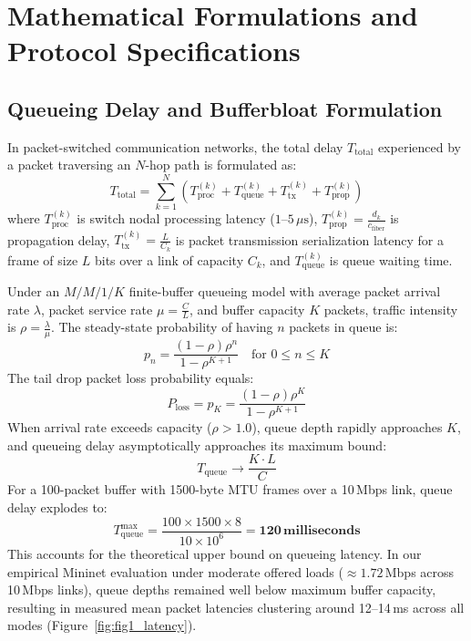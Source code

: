 \chapter[Mathematical Formulations and Protocol Specs]{Mathematical Formulations and Protocol Specifications}
\label{app:math_and_specs}

\section{Queueing Delay and Bufferbloat Formulation}
In packet-switched communication networks, the total delay $T_{\text{total}}$ experienced by a packet traversing an $N$-hop path is formulated as:
\begin{equation}
  T_{\text{total}} = \sum_{k=1}^N \left( T_{\text{proc}}^{(k)} + T_{\text{queue}}^{(k)} + T_{\text{tx}}^{(k)} + T_{\text{prop}}^{(k)} \right)
\end{equation}
where $T_{\text{proc}}^{(k)}$ is switch nodal processing latency ($1\text{--}5\,\mu\text{s}$), $T_{\text{prop}}^{(k)} = \frac{d_k}{c_{\text{fiber}}}$ is propagation delay, $T_{\text{tx}}^{(k)} = \frac{L}{C_k}$ is packet transmission serialization latency for a frame of size $L$ bits over a link of capacity $C_k$, and $T_{\text{queue}}^{(k)}$ is queue waiting time.

Under an $M/M/1/K$ finite-buffer queueing model with average packet arrival rate $\lambda$, packet service rate $\mu = \frac{C}{L}$, and buffer capacity $K$ packets, traffic intensity is $\rho = \frac{\lambda}{\mu}$. The steady-state probability of having $n$ packets in queue is:
\begin{equation}
  p_n = \frac{(1 - \rho)\rho^n}{1 - \rho^{K+1}} \quad \text{for } 0 \le n \le K
\end{equation}
The tail drop packet loss probability equals:
\begin{equation}
  P_{\text{loss}} = p_K = \frac{(1 - \rho)\rho^K}{1 - \rho^{K+1}}
\end{equation}
When arrival rate exceeds capacity ($\rho > 1.0$), queue depth rapidly approaches $K$, and queueing delay asymptotically approaches its maximum bound:
\begin{equation}
  T_{\text{queue}} \longrightarrow \frac{K \cdot L}{C}
\end{equation}
For a 100-packet buffer with 1500-byte MTU frames over a 10\,Mbps link, queue delay explodes to:
\begin{equation}
  T_{\text{queue}}^{\text{max}} = \frac{100 \times 1500 \times 8}{10 \times 10^6} = \mathbf{120\,\text{milliseconds}}
\end{equation}
This accounts for the theoretical upper bound on queueing latency. In our empirical Mininet evaluation under moderate offered loads ($\approx 1.72$\,Mbps across 10\,Mbps links), queue depths remained well below maximum buffer capacity, resulting in measured mean packet latencies clustering around 12–14\,ms across all modes (Figure~\ref{fig:fig1_latency}).

